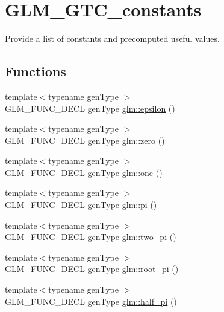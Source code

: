 \hypertarget{group__gtc__constants}{\section{G\-L\-M\-\_\-\-G\-T\-C\-\_\-constants}
\label{group__gtc__constants}
}


Provide a list of constants and precomputed useful values.  


\subsection*{Functions}
\begin{DoxyCompactItemize}
\item 
{\footnotesize template$<$typename gen\-Type $>$ }\\G\-L\-M\-\_\-\-F\-U\-N\-C\-\_\-\-D\-E\-C\-L gen\-Type \hyperlink{group__gtc__constants_gacb41049b8d22c8aa90e362b96c524feb}{glm\-::epsilon} ()
\item 
{\footnotesize template$<$typename gen\-Type $>$ }\\G\-L\-M\-\_\-\-F\-U\-N\-C\-\_\-\-D\-E\-C\-L gen\-Type \hyperlink{group__gtc__constants_ga5cc97dd01d37fc199264ff6030578435}{glm\-::zero} ()
\item 
{\footnotesize template$<$typename gen\-Type $>$ }\\G\-L\-M\-\_\-\-F\-U\-N\-C\-\_\-\-D\-E\-C\-L gen\-Type \hyperlink{group__gtc__constants_ga8186ec2c330457d41d9686c47cd3b2d1}{glm\-::one} ()
\item 
{\footnotesize template$<$typename gen\-Type $>$ }\\G\-L\-M\-\_\-\-F\-U\-N\-C\-\_\-\-D\-E\-C\-L gen\-Type \hyperlink{group__gtc__constants_gae671930537266a9a650ccb4b88757692}{glm\-::pi} ()
\item 
{\footnotesize template$<$typename gen\-Type $>$ }\\G\-L\-M\-\_\-\-F\-U\-N\-C\-\_\-\-D\-E\-C\-L gen\-Type \hyperlink{group__gtc__constants_ga00c3f7bc750ff62bbf47c8913a53daa5}{glm\-::two\-\_\-pi} ()
\item 
{\footnotesize template$<$typename gen\-Type $>$ }\\G\-L\-M\-\_\-\-F\-U\-N\-C\-\_\-\-D\-E\-C\-L gen\-Type \hyperlink{group__gtc__constants_ga1cfeb345f34f72697d14f4db8d5d4c6c}{glm\-::root\-\_\-pi} ()
\item 
{\footnotesize template$<$typename gen\-Type $>$ }\\G\-L\-M\-\_\-\-F\-U\-N\-C\-\_\-\-D\-E\-C\-L gen\-Type \hyperlink{group__gtc__constants_ga7f7a1050729f3b03b1873a06ba4a472f}{glm\-::half\-\_\-pi} ()

\end{DoxyCompactItemize}
